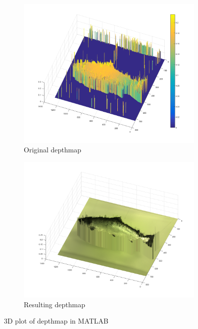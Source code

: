 \begin{figure}[H]
    \centering
    \begin{subfigure}{1\textwidth}
        \centering
        \includegraphics[width=.8\linewidth]{images/3D_results/original_3D_63}
        \caption{Original depthmap} 
        \label{fig:3D_original_63}
    \end{subfigure}\hspace*{\fill}
    
    \medskip
    \begin{subfigure}{1\textwidth}
        \centering
        \includegraphics[width=.8\linewidth]{images/3D_results/fixed_3D_63}
        \caption{Resulting depthmap} 
        \label{fig:3D_fixed_63}
    \end{subfigure}\hspace*{\fill}
    \caption{3D plot of depthmap in MATLAB}
    \label{fig:3D_plot_63}
\end{figure}


